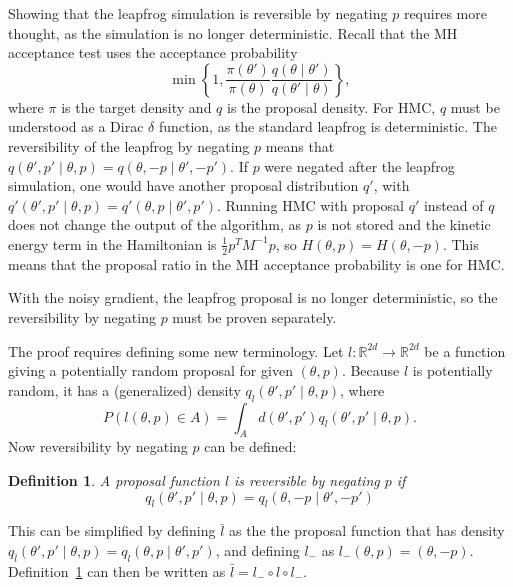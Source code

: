 \documentclass[english,twoside,openright]{HYgraduMLDS}
\newtheorem{definition}{Definition}
\newcommand{\R}{\mathbb{R}}
\begin{document}
Showing that the leapfrog simulation is reversible by negating \(p\) requires
more thought, as the simulation is no longer deterministic. Recall that the
MH acceptance test uses the acceptance probability
\[
  \min\left\{1, \frac{\pi(\theta')}{\pi(\theta)}
    \frac{q(\theta\mid \theta')}{q(\theta'\mid \theta)}\right\},
\]
where \(\pi\) is the target density and \(q\) is the proposal density.
For HMC, \(q\) must be understood as a Dirac \(\delta\) function, as the
standard leapfrog is deterministic. The reversibility of the leapfrog
by negating \(p\) means that
\(q(\theta', p'\mid \theta, p) = q(\theta, -p\mid \theta', -p')\).
If \(p\) were negated after the leapfrog simulation, one would have another
proposal distribution \(q'\), with
\(q'(\theta', p'\mid \theta, p) = q'(\theta, p\mid \theta', p')\).
Running HMC with proposal \(q'\) instead of \(q\) does not change the
output of the algorithm, as \(p\) is not stored and
the kinetic energy term in the Hamiltonian is \(\frac{1}{2}p^{T}M^{-1}p\), so
\(H(\theta, p) = H(\theta, -p)\). This means that the proposal ratio in the
MH acceptance probability is one for HMC.

With the noisy gradient, the leapfrog proposal is no longer deterministic,
so the reversibility by negating \(p\) must be proven separately.

The proof requires defining some new terminology. Let
\(l\colon \R^{2d} \to \R^{2d}\) be a function giving a potentially random
proposal for given \((\theta, p)\). Because \(l\) is potentially random,
it has a (generalized) density \(q_{l}(\theta', p' \mid \theta, p)\),
where
\[
  P(l(\theta, p) \in A) = \int_{A} d(\theta', p') q_{l}(\theta', p'\mid \theta, p).
\]
Now reversibility by negating \(p\) can be defined:
\begin{definition}\label{prop_revers_definition}
  A proposal function \(l\) is reversible by negating \(p\) if
  \[
    q_{l}(\theta', p'\mid \theta, p) = q_{l}(\theta, -p \mid \theta', -p')
  \]
\end{definition}
This can be simplified by defining \(\bar{l}\) as the the proposal
function that has density
\(q_{\bar{l}}(\theta', p'\mid \theta, p) = q_{l}(\theta, p\mid \theta', p')\),
and defining \(l_{-}\) as \(l_{-}(\theta, p) = (\theta, -p)\).
Definition~\ref{prop_revers_definition} can then be written as
\(\bar{l} = l_{-}\circ l\circ l_{-}\).
\end{document}
